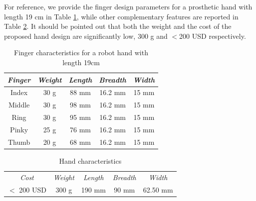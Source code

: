 For reference, we provide the finger design parameters for a prosthetic hand with length 19 cm in Table \ref{fingerparameters}, while other complementary features are reported in Table \ref{handcharacteristics}. It should be pointed out that both the weight and the cost of the proposed hand design are significantly low, 300 g and $<$200 USD respectively. 

\begin{table}[ht!]
\caption{Finger characteristics for a robot hand with length 19cm} \label{fingerparameters}
\begin{center}
\begin{tabular}[50]{ c c c c c }
{\it{Finger}} & {\it{Weight}} & {\it{Length}} & {\it{Breadth}} & {\it{Width}}\\
\hline
{Index} & {30 g} & {88 mm} & {16.2 mm} & {15 mm}\\
{Middle} & {30 g} & {98 mm} & {16.2 mm} & {15 mm}\\
{Ring} & {30 g} & {95 mm} & {16.2 mm} & {15 mm}\\
{Pinky} & {25 g} & {76 mm} & {16.2 mm} & {15 mm}\\
{Thumb} & {20 g} & {68 mm} & {16.2 mm} & {15 mm}\\
\end{tabular}
\end{center}
\end{table} 

\begin{table}[ht!]
\caption{Hand characteristics} \label{handcharacteristics}
\begin{center}
\begin{tabular}[50]{ c c c c c }
{\it{Cost}} &  {\it{Weight}} & {\it{Length}} & {\it{Breadth}} & {\it{Width}}\\
$<$ 200 USD & 300 g & 190 mm & 90 mm & 62.50 mm 
\end{tabular}
\end{center}
\end{table} 

